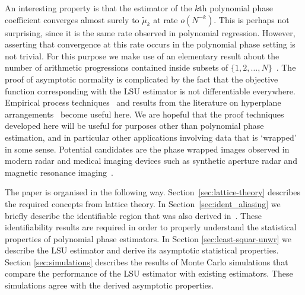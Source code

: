 \documentclass[journal]{IEEEtran}
\begin{document}
An interesting property is that the estimator of the $k$th polynomial phase coefficient converges almost surely to $\tilde{\mu}_k$ at rate $o(N^{-k})$.  This is perhaps not surprising, since it is the same rate observed in polynomial regression.  However, asserting that convergence at this rate occurs in the polynomial phase setting is not trivial.  For this purpose we make use of an elementary result about the number of arithmetic progressions contained inside subsets of $\{1,2,\dots,N\}$~\cite{Erdos_on_some_sequence_of_integers1936,Szemeredi_setint_no_k_arth1975,Gowers_new_proof2001}.  %
The proof of asymptotic normality is complicated by the fact that the objective function corresponding with the LSU estimator is not differentiable everywhere.  Empirical process techniques~\cite{Pollard_new_ways_clts_1986,Pollard_asymp_empi_proc_1989,van2009empirical,Dudley_unif_central_lim_th_1999} and results from the literature on hyperplane arrangements~\cite{Chazelle_discrepency_method_2000,Matousek_lect_disc_geom_2002} become useful here.  We are hopeful that the proof techniques developed here will be useful for purposes other than polynomial phase estimation, and in particular other applications involving data that is `wrapped' in some sense.  Potential candidates are the phase wrapped images observed in modern radar and medical imaging devices such as synthetic aperture radar and magnetic resonance imaging~\cite{Nico_phaseunwrappingSAR_2000,Friedlander_PD_phaseunwrapping_1996}.

The paper is organised in the following way. Section~\ref{sec:lattice-theory} describes the required concepts from lattice theory.  In Section~\ref{sec:ident_aliasing} we briefly describe the identifiable region that was also derived in~\cite{McKilliam2009IndentifiabliltyAliasingPolyphase}.  These identifiability results are required in order to properly understand the statistical properties of polynomial phase estimators. In Section \ref{sec:least-squar-unwr} we describe the LSU estimator and derive its asymptotic statistical properties.
Section \ref{sec:simulations} describes the results of Monte Carlo simulations that compare the performance of the LSU estimator with existing estimators.  These simulations agree with the derived asymptotic properties. 

\end{document}
